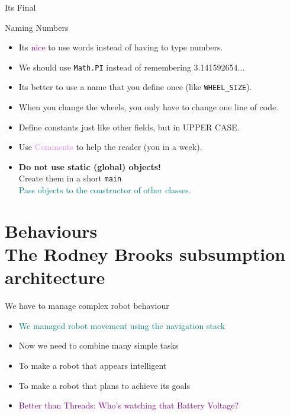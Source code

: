 \documentclass[color=pdftex,usenames,dvipsnames, aspectratio=169]{beamer}
\begin{document}
\begin{frame}[fragile]{Its Final}
\begin{block}{Naming Numbers}
\begin{itemize}
\item Its \textcolor{purple}{nice} to use words instead of having to type numbers.
\item We \alert{should} use \lstinline!Math.PI! instead of remembering 3.141592654...
\item \textcolor{OliveGreen}{Its better to use a name that you define once (like \lstinline!WHEEL_SIZE!).}
\item When you change the wheels, you only have to change one line of code.
\item \textcolor{OliveGreen}{Define constants just like other fields, but in UPPER CASE.}
\item Use \textcolor{violet}{Comments} to help the reader (you in a week).
\item \textbf{Do not use static (global) objects!}\\
\textcolor{BrickRed}{Create them in a short \lstinline!main!\\}
\textcolor{teal}{Pass objects to the constructor of other classes.}
\end{itemize}
\end{block}
\end{frame}

\section{Behaviours\\ The Rodney Brooks subsumption architecture}
\begin{frame}
\begin{block}{We have to manage complex robot behaviour}
\begin{itemize}
    \item \textcolor{teal}{We managed robot movement using the navigation stack}
    \item \textcolor{BrickRed}{Now we need to combine many simple tasks}
    \item \textcolor{OliveGreen}{To make a robot that appears intelligent}
    \item \textcolor{OliveGreen}{To make a robot that plans to achieve its goals}
    \item \textcolor{purple}{Better than Threads: Who's watching that Battery Voltage?}
\end{itemize}
\end{block}
\end{frame}
\end{document}
